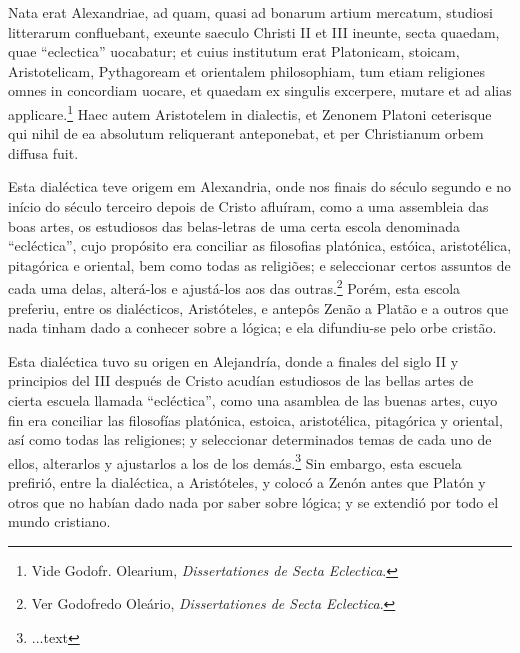 \documentclass{article}
\begin{document}
\begin{paracol}{3}
\begin{nthcolumn}{2}
\end{nthcolumn}
\vspace{0.5cm}
\begin{nthcolumn*}{0} %
  Nata erat Alexandriae, ad quam, quasi ad bonarum artium mercatum, studiosi litterarum confluebant, exeunte saeculo Christi II et III ineunte, secta quaedam, quae “eclectica” uocabatur; et cuius institutum erat Platonicam, stoicam, Aristotelicam, Pythagoream et orientalem philosophiam, tum etiam religiones omnes in concordiam uocare, et quaedam ex singulis excerpere, mutare et ad alias applicare.\footnote[44]{Vide Godofr. Olearium, \emph{Dissertationes de Secta Eclectica}.} Haec autem Aristotelem in dialectis, et Zenonem Platoni ceterisque qui nihil de ea absolutum reliquerant anteponebat, et per Christianum orbem diffusa fuit.
\end{nthcolumn*}
\vspace{0.5cm}
\begin{nthcolumn}{1} %
  Esta dialéctica teve origem em Alexandria, onde nos finais do século segundo e no início do século terceiro depois de Cristo afluíram, como a uma assembleia das boas artes, os estudiosos das belas-letras de uma certa escola denominada “ecléctica”, cujo propósito era conciliar as filosofias platónica, estóica, aristotélica, pitagórica e oriental, bem como todas as religiões; e seleccionar certos assuntos de cada uma delas, alterá-los e ajustá-los aos das outras.\footnote[44]{Ver Godofredo Oleário, \emph{Dissertationes de Secta Eclectica}.} Porém, esta escola preferiu, entre os dialécticos, Aristóteles, e antepôs Zenão a Platão e a outros que nada tinham dado a conhecer sobre a lógica; e ela difundiu-se pelo orbe cristão.
\end{nthcolumn}
\vspace{0.5cm}
\begin{nthcolumn}{2} %
  Esta dialéctica tuvo su origen en Alejandría, donde a finales del siglo II y principios del III después de Cristo acudían estudiosos de las bellas artes de cierta escuela llamada “ecléctica”, como una asamblea de las buenas artes, cuyo fin era conciliar las filosofías platónica, estoica, aristotélica, pitagórica y oriental, así como todas las religiones; y seleccionar determinados temas de cada uno de ellos, alterarlos y ajustarlos a los de los demás.\footnote[44]{...text} Sin embargo, esta escuela prefirió, entre la dialéctica, a Aristóteles, y colocó a Zenón antes que Platón y otros que no habían dado nada por saber sobre lógica; y se extendió por todo el mundo cristiano.

\end{nthcolumn}
\end{paracol}
\end{document}
